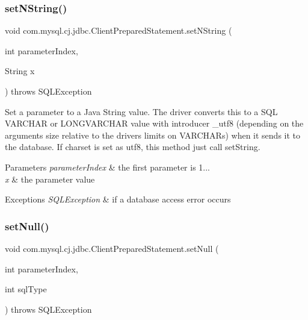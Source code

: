 \subsubsection{\texorpdfstring{set\+N\+String()}{setNString()}}
{\footnotesize\ttfamily void com.\+mysql.\+cj.\+jdbc.\+Client\+Prepared\+Statement.\+set\+N\+String (\begin{DoxyParamCaption}\item[{int}]{parameter\+Index,  }\item[{String}]{x }\end{DoxyParamCaption}) throws S\+Q\+L\+Exception}

Set a parameter to a Java String value. The driver converts this to a S\+QL V\+A\+R\+C\+H\+AR or L\+O\+N\+G\+V\+A\+R\+C\+H\+AR value with introducer \+\_\+utf8 (depending on the arguments size relative to the driver\textquotesingle{}s limits on V\+A\+R\+C\+H\+A\+Rs) when it sends it to the database. If charset is set as utf8, this method just call set\+String.


\begin{DoxyParams}{Parameters}
{\em parameter\+Index} & the first parameter is 1... \\
\hline
{\em x} & the parameter value\\
\hline
\end{DoxyParams}

\begin{DoxyExceptions}{Exceptions}
{\em S\+Q\+L\+Exception} & if a database access error occurs \\
\hline
\end{DoxyExceptions}
\mbox{\label{classcom_1_1mysql_1_1cj_1_1jdbc_1_1_client_prepared_statement_a18540732972b9e10e81482f19740512d}} 
\subsubsection{\texorpdfstring{set\+Null()}{setNull()}\hspace{0.1cm}{\footnotesize\ttfamily [1/3]}}
{\footnotesize\ttfamily void com.\+mysql.\+cj.\+jdbc.\+Client\+Prepared\+Statement.\+set\+Null (\begin{DoxyParamCaption}\item[{int}]{parameter\+Index,  }\item[{int}]{sql\+Type }\end{DoxyParamCaption}) throws S\+Q\+L\+Exception}

